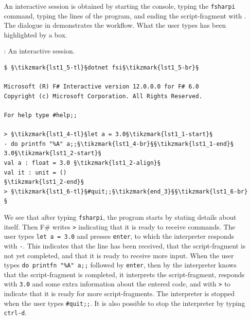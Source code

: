 \documentclass[springer.tex]{subfiles}
\begin{document}

An interactive session is obtained by starting the console, typing the \lstinline[language=console]{fsharpi} command, typing the lines of the program, and ending the script-fragment with \lexeme{;;}. The dialogue in  demonstrates the workflow. What the user types has been highlighted by a box.
%
\begin{codeNOutput}[label=interactiveSession,
  top=-5pt,
  bottom=-5pt,
  left=-2pt,
  right=-2pt,
]{: An interactive session.}
  \begin{lstlisting}[language=console,escapechar=§]
$ §\tikzmark{lst1_5-tl}§dotnet fsi§\tikzmark{lst1_5-br}§

Microsoft (R) F# Interactive version 12.0.0.0 for F# 6.0
Copyright (c) Microsoft Corporation. All Rights Reserved.

For help type #help;;

> §\tikzmark{lst1_4-tl}§let a = 3.0§\tikzmark{lst1_1-start}§
- do printfn "%A" a;;§\tikzmark{lst1_4-br}§§\tikzmark{lst1_1-end}§
3.0§\tikzmark{lst1_2-start}§
val a : float = 3.0 §\tikzmark{lst1_2-align}§
val it : unit = ()
§\tikzmark{lst1_2-end}§
> §\tikzmark{lst1_6-tl}§#quit;;§\tikzmark{end_3}§§\tikzmark{lst1_6-br}§
\end{lstlisting}%
\end{codeNOutput}%
%
%
%
%
We see that after typing \lstinline[language=console]{fsharpi}, the program starts by stating details about itself. Then F\# writes \lstinline{>} indicating that it is ready to receive commands. The user types \lstinline{let a = 3.0} and presses \lstinline[language=console]{enter}, to which the interpreter responds with \lstinline{-}. This indicates that the line has been received, that the script-fragment is not yet completed, and that it is ready to receive more input. When the user types \lstinline{do printfn "%A" a;;} %
followed by \lstinline[language=console]{enter}, then by \lexeme{;;} the interpreter knows that the script-fragment is completed, it interprets the script-fragment, responds with \lstinline{3.0} and some extra information about the entered code, and with \lstinline{>} to indicate that it is ready for more script-fragments. The interpreter is stopped when the user types \lstinline[language=console]{#quit;;}. It is also possible to stop the interpreter by typing \lstinline[language=console]{ctrl-d}.
\end{document}
